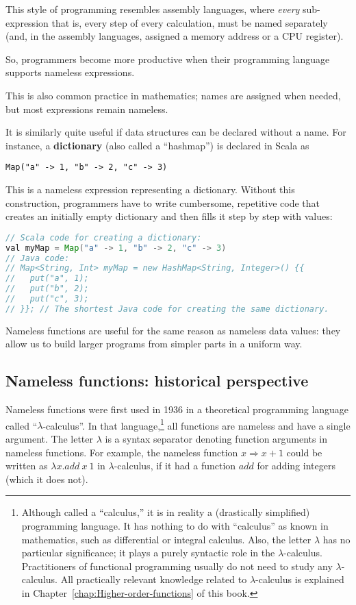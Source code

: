 This style of programming resembles assembly languages,
where \emph{every} sub-expression \textendash{} that is, every step
of every calculation, \textendash{} must be named separately (and,
in the assembly languages, assigned a memory address or a CPU register).

So, programmers become more productive when their programming language
supports nameless expressions.

This is also common practice in mathematics; names are assigned when
needed, but most expressions remain nameless.

It is similarly quite useful if data structures can be declared without
a name. For instance, a \textbf{dictionary} (also
called a ``hashmap'') is declared in Scala as
\begin{lstlisting}
Map("a" -> 1, "b" -> 2, "c" -> 3)
\end{lstlisting}
This is a nameless expression representing a dictionary. Without this
construction, programmers have to write cumbersome, repetitive code
that creates an initially empty dictionary and then fills it step
by step with values:
\begin{lstlisting}[language=Java]
// Scala code for creating a dictionary:
val myMap = Map("a" -> 1, "b" -> 2, "c" -> 3)
// Java code:
// Map<String, Int> myMap = new HashMap<String, Integer>() {{
//   put("a", 1);
//   put("b", 2);
//   put("c", 3);
// }}; // The shortest Java code for creating the same dictionary.
\end{lstlisting}

Nameless functions are useful for the same reason as nameless data
values: they allow us to build larger programs from simpler parts
in a uniform way.

\subsection{Nameless functions: historical perspective}

Nameless functions were first used in 1936 in a theoretical programming
language called ``$\lambda$-calculus''.
In that language,\footnote{Although called a ``calculus,'' it is in reality a (drastically
simplified) programming language. It has nothing to do with ``calculus''
as known in mathematics, such as differential or integral calculus.
Also, the letter $\lambda$ has no particular significance; it plays
a purely syntactic role in the $\lambda$-calculus. Practitioners
of functional programming usually do not need to study any $\lambda$-calculus.
All practically relevant knowledge related to $\lambda$-calculus
is explained in Chapter~\ref{chap:Higher-order-functions} of this
book.} all functions are nameless and have a single argument. The letter
$\lambda$ is a syntax separator denoting function arguments in nameless
functions. For example, the nameless function $x\Rightarrow x+1$
could be written as $\lambda x.add~x~1$ in $\lambda$-calculus, if
it had a function $add$ for adding integers (which it does not).

